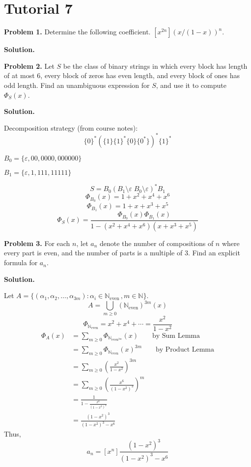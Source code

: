 \section{Tutorial 7}
\textbf{Problem 1.} Determine the following coefficient.
$ [x^{2n}](x/(1-x))^n $.

\textbf{Solution.}

\textbf{Problem 2.} Let $ S $ be the class of binary strings in which every
block has length of at most $ 6 $, every block of zeros has even length,
and every block of ones has odd length. Find an unambiguous expression for $ S $,
and use it to compute $ \Phi_S(x) $.

\textbf{Solution.}

Decomposition strategy (from course notes):
\[ \{0\}^*(\{1\}\{1\}^*\{0\}\{0^*\})^*\{1\}^* \]

$ B_0=\{\varepsilon,00,0000,000000\} $

$ B_1=\{\varepsilon, 1, 111, 11111\} $

\[ S=B_0(B_1\setminus \varepsilon\; B_0\setminus \varepsilon)^* B_1 \]
\[ \Phi_{B_0}(x)=1+x^2+x^4+x^6 \]
\[ \Phi_{B_1}(x)=1+x+x^3+x^5 \]
\[ \Phi_S(x)=\frac{\Phi_{B_0}(x)\Phi_{B_1}(x)}{1-(x^2+x^4+x^6)(x+x^3+x^5)} \]


\textbf{Problem 3.} For each $ n $, let $ a_n $ denote the number of compositions
of $ n $ where every part is even, and the number of parts is a multiple of $ 3 $.
Find an explicit formula for $ a_n $.

\textbf{Solution.}

Let $ A= \{(\alpha_1,\alpha_2,\ldots,\alpha_{3m}):
    \alpha_i\in\mathbb{N}_{\text{even}}\,, m\in\mathbb{N}\} $.
\[ A=\bigcup_{m\geqslant 0}(\mathbb{N}_{\text{even}})^{3m}(x) \]
\[ \Phi_{\mathbb{N}_{\text{even}}}=x^2+x^4+\cdots=\frac{x^2}{1-x^2} \]
\begin{align*}
    \Phi_A(x)
     & =\sum\limits_{m\geqslant 0} \Phi_{\mathbb{N}_{\text{even}^{3m}}}(x)
    \qquad\text{by Sum Lemma}                                              \\
     & =\sum\limits_{m\geqslant 0} \Phi_{\mathbb{N}_{\text{even}}}(x)^{3m}
    \qquad\text{by Product Lemma}                                          \\
     & =\sum\limits_{m\geqslant 0} \left( \frac{x^2}{1-x^2} \right)^{3m}   \\
     & =\sum\limits_{m\geqslant 0} \left( \frac{x^6}{(1-x^2)^3}  \right)^m \\
     & =\frac{1}{1-\frac{x^6}{(1-x^2)^3}}                                  \\
     & =\frac{(1-x^2)^3}{(1-x^2)^3-x^6}
\end{align*}
Thus,
\[ a_n=[x^n]\frac{(1-x^2)^3}{(1-x^2)^3-x^6} \]


